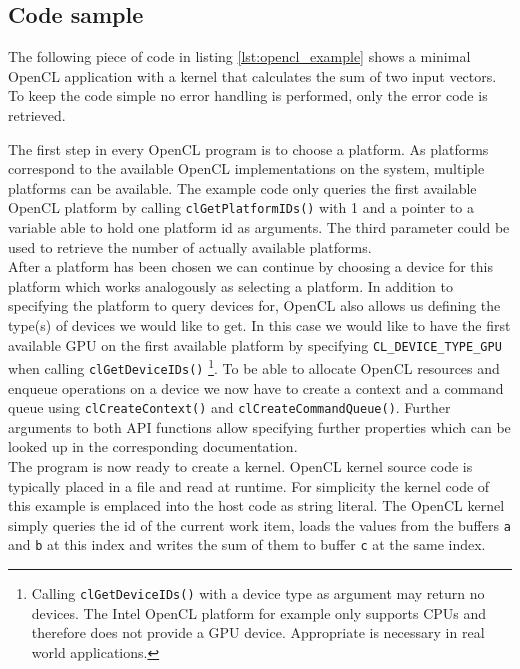 \subsection{Code sample}
\label{sec:code_sample}

The following piece of code in listing \ref{lst:opencl_example} shows a minimal OpenCL application with a kernel that calculates the sum of two input vectors. To keep the code simple no error handling is performed, only the error code is retrieved.



The first step in every OpenCL program is to choose a platform. As platforms correspond to the available OpenCL implementations on the system, multiple platforms can be available. The example code only queries the first available OpenCL platform by calling \lstinline!clGetPlatformIDs()! with 1 and a pointer to a variable able to hold one platform id as arguments. The third parameter could be used to retrieve the number of actually available platforms. \\
After a platform has been chosen we can continue by choosing a device for this platform which works analogously as selecting a platform. In addition to specifying the platform to query devices for, OpenCL also allows us defining the type(s) of devices we would like to get. In this case we would like to have the first available GPU on the first available platform by specifying \lstinline!CL_DEVICE_TYPE_GPU! when calling \lstinline!clGetDeviceIDs()! \footnote{Calling \lstinline!clGetDeviceIDs()! with a device type as argument may return no devices. The Intel OpenCL platform for example only supports CPUs and therefore does not provide a GPU device. Appropriate is necessary in real world applications.}. To be able to allocate OpenCL resources and enqueue operations on a device we now have to create a context and a command queue using \lstinline!clCreateContext()! and \lstinline!clCreateCommandQueue()!. Further arguments to both API functions allow specifying further properties which can be looked up in the corresponding documentation. \\
The program is now ready to create a kernel. OpenCL kernel source code is typically placed in a file and read at runtime. For simplicity the kernel code of this example is emplaced into the host code as string literal. The OpenCL kernel simply queries the id of the current work item, loads the values from the buffers \lstinline!a! and \lstinline!b! at this index and writes the sum of them to buffer \lstinline!c! at the same index. \\
